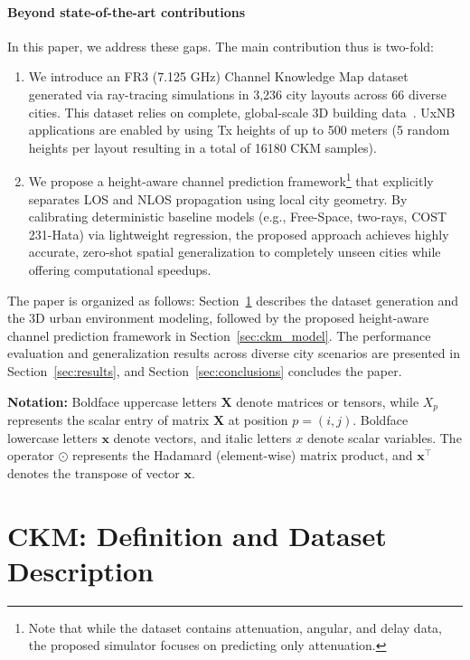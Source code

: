 \documentclass[10pt,conference,letterpaper]{IEEEtran}
\begin{document}
\paragraph{Beyond state-of-the-art contributions}
In this paper, we address these gaps. The main contribution thus is two-fold:
\begin{enumerate}
    \item We introduce an FR3 (7.125 GHz) Channel Knowledge Map dataset generated via ray-tracing simulations in 3,236 city layouts across 66 diverse cities. This dataset relies on complete, global-scale 3D building data~\cite{Che2024globfp,Zhu2025atlas}. UxNB applications are enabled by using Tx heights of up to 500 meters (5 random heights per layout resulting in a total of 16180 CKM samples). 
    \item We propose a height-aware channel prediction framework\footnote{Note that while the dataset contains attenuation, angular, and delay data, the proposed simulator focuses on predicting only attenuation.} that explicitly separates LOS and NLOS propagation using local city geometry. By calibrating deterministic baseline models (e.g., Free-Space, two-rays, COST 231-Hata) via lightweight regression, the proposed approach achieves highly accurate, zero-shot spatial generalization to completely unseen cities while offering computational speedups.
\end{enumerate}

    
The paper is organized as follows: Section~\ref{sec:ckm_dataset} describes the dataset generation and the 3D urban environment modeling, followed by the proposed height-aware channel prediction framework in Section~\ref{sec:ckm_model}. The performance evaluation and generalization results across diverse city scenarios are presented in Section~\ref{sec:results}, and Section~\ref{sec:conclusions} concludes the paper.

\textbf{Notation:} Boldface uppercase letters $\mathbf{X}$ denote matrices or tensors, while ${X}_{p}$ represents the scalar entry of matrix $\mathbf{X}$ at position $p = (i, j)$. Boldface lowercase letters $\mathbf{x}$ denote vectors, and italic letters $x$ denote scalar variables. The operator $\odot$ represents the Hadamard (element-wise) matrix product, and $\mathbf{x}^\top$ denotes the transpose of vector $\mathbf{x}$.

\section{CKM: Definition and Dataset Description}
\label{sec:ckm_dataset}
\end{document}

